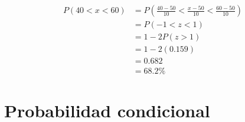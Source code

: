 \documentclass[12pt, letterpaper]{article}
\begin{document}
\begin{enumerate}
\begin{equation*}
    \end{equation*}
    \begin{equation*}
        \begin{aligned}
            P(40 < x < 60)
            & = P(\frac{40-50}{10} < \frac{x-50}{10} < \frac{60-50}{10}) \\
            & = P(-1 < z < 1) \\
            & = 1 - 2P(z > 1) \\
            & = 1 - 2(0.159) \\
            & = 0.682 \\
            & = 68.2\%
        \end{aligned}
    \end{equation*}
\end{enumerate}

\newpage

\section{Probabilidad condicional}
\end{document}

